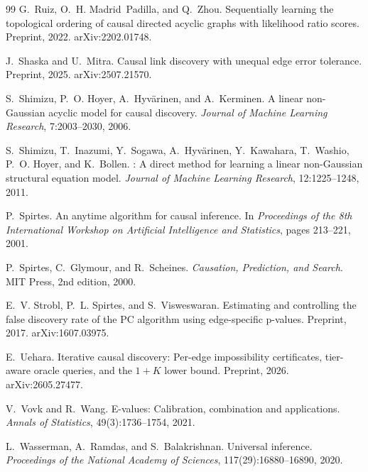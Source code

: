 \documentclass[11pt,a4paper]{article}
\theoremstyle{definition}
\theoremstyle{remark}
\begin{document}
\begin{thebibliography}{99}
G.~Ruiz, O.~H. Madrid~Padilla, and Q.~Zhou.
\newblock Sequentially learning the topological ordering of causal directed
  acyclic graphs with likelihood ratio scores.
\newblock Preprint, 2022. arXiv:2202.01748.

J.~Shaska and U.~Mitra.
\newblock Causal link discovery with unequal edge error tolerance.
\newblock Preprint, 2025. arXiv:2507.21570.

S.~Shimizu, P.~O. Hoyer, A.~Hyv\"arinen, and A.~Kerminen.
\newblock A linear non-{G}aussian acyclic model for causal discovery.
\newblock \emph{Journal of Machine Learning Research}, 7:2003--2030, 2006.

S.~Shimizu, T.~Inazumi, Y.~Sogawa, A.~Hyv\"arinen, Y.~Kawahara, T.~Washio,
  P.~O. Hoyer, and K.~Bollen.
: A direct method for learning a linear non-{G}aussian
  structural equation model.
\newblock \emph{Journal of Machine Learning Research}, 12:1225--1248, 2011.

P.~Spirtes.
\newblock An anytime algorithm for causal inference.
\newblock In \emph{Proceedings of the 8th International Workshop on Artificial
  Intelligence and Statistics}, pages 213--221, 2001.

P.~Spirtes, C.~Glymour, and R.~Scheines.
\newblock \emph{Causation, Prediction, and Search}.
\newblock MIT Press, 2nd edition, 2000.

E.~V. Strobl, P.~L. Spirtes, and S.~Visweswaran.
\newblock Estimating and controlling the false discovery rate of the {PC}
  algorithm using edge-specific p-values.
\newblock Preprint, 2017. arXiv:1607.03975.

E.~Uehara.
\newblock Iterative causal discovery: Per-edge impossibility certificates,
  tier-aware oracle queries, and the $1+K$ lower bound.
\newblock Preprint, 2026. arXiv:2605.27477.

V.~Vovk and R.~Wang.
\newblock E-values: Calibration, combination and applications.
\newblock \emph{Annals of Statistics}, 49(3):1736--1754, 2021.

L.~Wasserman, A.~Ramdas, and S.~Balakrishnan.
\newblock Universal inference.
\newblock \emph{Proceedings of the National Academy of Sciences},
  117(29):16880--16890, 2020.

\end{thebibliography}
\end{document}
